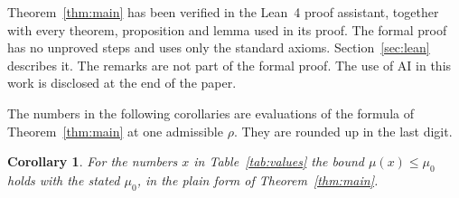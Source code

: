 \documentclass[11pt]{amsart}
\newtheorem{corollary}[theorem]{Corollary}
\theoremstyle{definition}
\theoremstyle{remark}
\numberwithin{equation}{section}
\begin{document}
Theorem~\ref{thm:main} has been verified in the Lean~4 proof assistant, together with every theorem, proposition and
lemma used in its proof. The formal proof has no unproved steps and uses only the standard axioms.
Section~\ref{sec:lean} describes it. The remarks are not part of the formal proof. The use of AI in this work is
disclosed at the end of the paper.

The numbers in the following corollaries are evaluations of the formula of Theorem~\ref{thm:main} at one admissible
$\rho$. They are rounded up in the last digit.

\begin{corollary}\label{cor:table}
For the numbers $x$ in Table~\ref{tab:values} the bound $\mu(x)\le\mu_0$ holds with the stated $\mu_0$, in the plain
form of Theorem~\ref{thm:main}.
\end{corollary}
\end{document}
